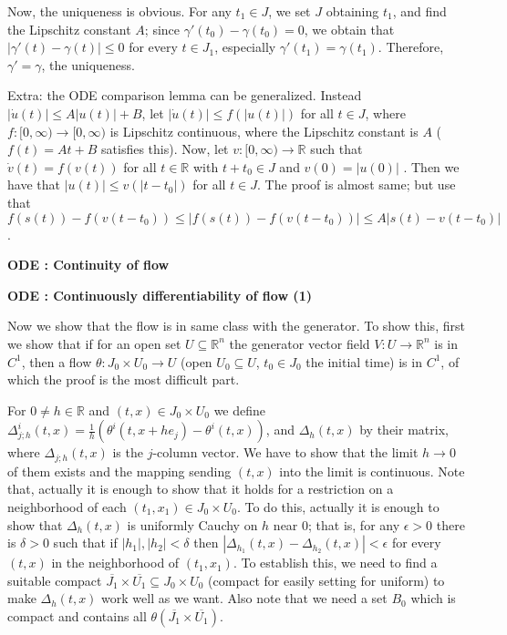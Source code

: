 \documentclass{article}
\newcommand{\ReR}{\mathbb{R}}
\begin{document}
Now, the uniqueness is obvious.
For any $t_1 \in J$, we set $J$ obtaining $t_1$, and find the Lipschitz constant $A$; since $\gamma'(t_0) - \gamma(t_0) = 0$, we obtain that $|\gamma'(t) - \gamma(t)| \le 0$ for every $t \in J_1$, especially $\gamma'(t_1) = \gamma(t_1)$.
Therefore, $\gamma' = \gamma$, the uniqueness.

Extra: the ODE comparison lemma can be generalized.
Instead $|\dot{u}(t)| \le A|u(t)| + B$, let $|\dot{u}(t)| \le f(|u(t)|)$ for all $t \in J$, where $f : [0, \infty) \to [0, \infty)$ is Lipschitz continuous, where the Lipschitz constant is $A$ ($f(t) = At + B$ satisfies this).
Now, let $v : [0, \infty) \to \ReR$ such that $\dot{v}(t) = f(v(t))$ for all $t \in \ReR$ with $t + t_0 \in J$ and $v(0) = |u(0)|$ .
Then we have that $|u(t)| \le v(|t - t_0|)$ for all $t \in J$.
The proof is almost same; but use that $f(s(t)) - f(v(t - t_0)) \le |f(s(t)) - f(v(t - t_0))| \le A |s(t) - v(t - t_0)|$.

\newpage

\textbf{ODE : Continuity of flow}



\newpage

\textbf{ODE : Continuously differentiability of flow (1)}

Now we show that the flow is in same class with the generator.
To show this, first we show that if for an open set $U \subseteq \ReR^n$ the generator vector field $V : U \to \ReR^n$ is in $C^1$, then a flow $\theta : J_0 \times U_0 \to U$ (open $U_0 \subseteq U$, $t_0 \in J_0$ the initial time) is in $C^1$, of which the proof is the most difficult part.

For $0 \ne h \in \ReR$ and $(t, x) \in J_0 \times U_0$ we define $\Delta^i_{j; h}(t, x) = \frac{1}{h} (\theta^i(t, x + he_j) - \theta^i(t, x))$, and $\Delta_{h}(t, x)$ by their matrix, where $\Delta_{j; h}(t, x)$ is the $j$-column vector.
We have to show that the limit $h \to 0$ of them exists and the mapping sending $(t, x)$ into the limit is continuous.
Note that, actually it is enough to show that it holds for a restriction on a neighborhood of each $(t_1, x_1) \in J_0 \times U_0$.
To do this, actually it is enough to show that $\Delta_{h}(t, x)$ is uniformly Cauchy on $h$ near 0; that is, for any $\epsilon > 0$ there is $\delta > 0$ such that if $|h_1|, |h_2| < \delta$ then $|\Delta_{h_1}(t, x) - \Delta_{h_2}(t, x)| < \epsilon$ for every $(t, x)$ in the neighborhood of $(t_1, x_1)$.
To establish this, we need to find a suitable compact $\overline{J_1} \times \overline{U_1} \subseteq J_0 \times U_0$ (compact for easily setting for uniform) to make $\Delta_{h}(t, x)$ work well as we want.
Also note that we need a set $B_0$ which is compact and contains all $\theta(\overline{J_1} \times \overline{U_1})$.
\end{document}
